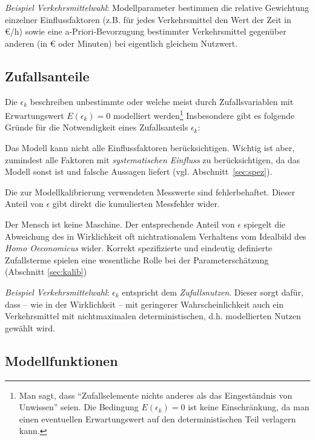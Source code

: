 \textit{Beispiel Verkehrsmittelwahl}: Modellparameter bestimmen die
relative Gewichtung einzelner Einflussfaktoren (z.B. f\"ur jedes
Verkehrsmittel den Wert der Zeit
in \euro{}/h) sowie eine a-Priori-Bevorzugung bestimmter Verkehrsmittel
gegen\"uber anderen  (in \euro{} oder Minuten) bei eigentlich gleichem Nutzwert.

\subsection{\label{sec:genStoch}Zufallsanteile}

Die $\epsilon_k$  beschreiben unbestimmte oder
 welche meist durch Zufallsvariablen
mit Erwartungswert $E(\epsilon_k)=0$ modelliert werden\footnote{Man
sagt,  dass ``Zufallselemente nichts anderes als das
Eingest\"andnis von Unwissen'' seien. Die Bedingung $E(\epsilon_k)=0$
ist keine Einschr\"ankung, da man einen eventuellen Erwartungswert auf
den deterministischen Teil verlagern kann.} 
Insbesondere gibt es folgende Gr\"unde f\"ur die Notwendigkeit eines
Zufallsanteils $\epsilon_k$:
\bi
\item Das Modell kann  nicht alle Einflussfaktoren
ber\"ucksichtigen. Wichtig ist aber, zumindest alle Faktoren mit
\emph{systematischen Einfluss} zu ber\"ucksichtigen, da das Modell
sonst  ist und falsche Aussagen liefert
(vgl. Abschnitt~\ref{sec:spez}).
\item Die zur Modellkalibrierung verwendeten Messwerte sind
fehlerbehaftet. Dieser Anteil von $\epsilon$ gibt direkt die kumulierten
Messfehler wider.
\item Der Mensch ist keine Maschine. Der entsprechende Anteil von 
$\epsilon$ spiegelt die Abweichung des in Wirklichkeit oft
nichtrationalem Verhaltens vom Idealbild des \emph{Homo Oeconomicus}
wider.
\ei
Korrekt spezifizierte und eindeutig definierte 
Zufallsterme spielen eine wesentliche Rolle bei der
Parametersch\"atzung
(Abschnitt \ref{sec:kalib})

\textit{Beispiel Verkehrsmittelwahl}: $\epsilon_k$ entspricht dem
\emph{Zufallsnutzen}. Dieser sorgt daf\"ur, dass -- wie in der
Wirklichkeit -- mit geringerer Wahrscheinlichkeit auch ein
Verkehrsmittel mit nichtmaximalen deterministischen,
d.h. modellierten Nutzen gew\"ahlt wird.

\subsection{Modellfunktionen}

